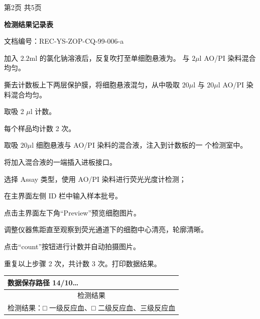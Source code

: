 \documentclass[UTF8,10pt,a4paper,fontset=fandol]{ctexart}
\newcommand{\fieldvalue}[1]{#1}
\newcommand{\handwritten}[1]{#1}
\begin{document}
\begin{center}
第2页 共5页
\end{center}

\newpage

\begin{center}
\small
\textbf{检测结果记录表}
\end{center}

\noindent
文档编号：REC-YS-ZOP-CQ-99-006-a

\vspace{0.3em}

\noindent
加入 $2.2\mathrm{ml}$ 的氯化钠溶液后，反复吹打至单细胞悬液为。 与 $2\mu\mathrm{l}$ AO/PI 染料混合均匀。

\noindent
撕去计数板上下两层保护膜，将细胞悬液混匀，从中吸取 $20\mu\mathrm{l}$ 与 $20\mu\mathrm{l}$ AO/PI 染料混合均匀。

\noindent
取吸
\fieldvalue{\handwritten{2}}
$\mu\mathrm{l}$ 计数。

\noindent
每个样品均计数
\fieldvalue{\handwritten{2}}
次。

\noindent
取吸 $20\mu\mathrm{l}$ 细胞悬液与 AO/PI 染料的混合液，注入到计数板的一 个检测室中。

\noindent
将加入混合液的一端插入进板接口。

\noindent
选择 Assay 类型，使用 AO/PI 染料进行荧光光度计检测；

\noindent
在主界面左侧 ID 栏中输入样本批号。

\noindent
点击主界面左下角“Preview”预览细胞图片。

\noindent
调整仪器焦距直至观察到荧光通道下的细胞中心清亮，轮廓清晰。

\noindent
点击“count”按钮进行计数并自动拍摄图片。

\noindent
重复以上步骤 2 次，共计数 3 次。打印数据结果。

\begin{tabularx}{\textwidth}{|p{}|X|}
\hline
数据保存路径 \hfill
\fieldvalue{\handwritten{14/10\ldots}} \\
\hline
\multicolumn{2}{|c|}{检测结果} \\
\hline
\multicolumn{2}{|l|}{检测结果：□ 一级反应血、□ 二级反应血、三级反应血} \\
\hline
\end{tabularx}
\end{document}
